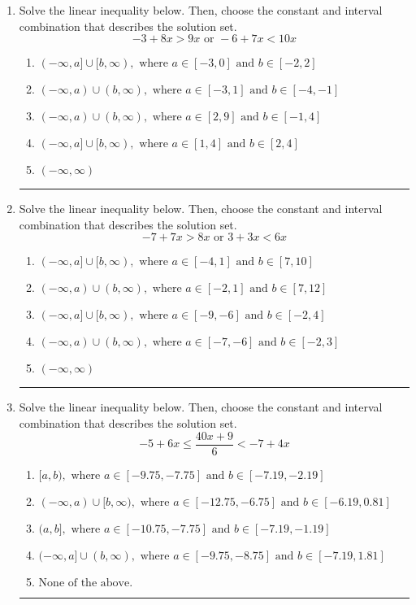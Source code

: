 \documentclass[14pt]{extbook}
\newcommand{\litem}[1]{\item#1\hspace*{-1cm}\rule{\textwidth}{0.4pt}}
\begin{document}
\begin{enumerate}
{\begin{enumerate}[label=\Alph*.]
\end{enumerate} }
\litem{
Solve the linear inequality below. Then, choose the constant and interval combination that describes the solution set.\[ -3 + 8 x > 9 x \text{ or } -6 + 7 x < 10 x \]\begin{enumerate}[label=\Alph*.]
\item \( (-\infty, a] \cup [b, \infty), \text{ where } a \in [-3, 0] \text{ and } b \in [-2, 2] \)
\item \( (-\infty, a) \cup (b, \infty), \text{ where } a \in [-3, 1] \text{ and } b \in [-4, -1] \)
\item \( (-\infty, a) \cup (b, \infty), \text{ where } a \in [2, 9] \text{ and } b \in [-1, 4] \)
\item \( (-\infty, a] \cup [b, \infty), \text{ where } a \in [1, 4] \text{ and } b \in [2, 4] \)
\item \( (-\infty, \infty) \)

\end{enumerate} }
\litem{
Solve the linear inequality below. Then, choose the constant and interval combination that describes the solution set.\[ -7 + 7 x > 8 x \text{ or } 3 + 3 x < 6 x \]\begin{enumerate}[label=\Alph*.]
\item \( (-\infty, a] \cup [b, \infty), \text{ where } a \in [-4, 1] \text{ and } b \in [7, 10] \)
\item \( (-\infty, a) \cup (b, \infty), \text{ where } a \in [-2, 1] \text{ and } b \in [7, 12] \)
\item \( (-\infty, a] \cup [b, \infty), \text{ where } a \in [-9, -6] \text{ and } b \in [-2, 4] \)
\item \( (-\infty, a) \cup (b, \infty), \text{ where } a \in [-7, -6] \text{ and } b \in [-2, 3] \)
\item \( (-\infty, \infty) \)

\end{enumerate} }
\litem{
Solve the linear inequality below. Then, choose the constant and interval combination that describes the solution set.\[ -5 + 6 x \leq \frac{40 x + 9}{6} < -7 + 4 x \]\begin{enumerate}[label=\Alph*.]
\item \( [a, b), \text{ where } a \in [-9.75, -7.75] \text{ and } b \in [-7.19, -2.19] \)
\item \( (-\infty, a) \cup [b, \infty), \text{ where } a \in [-12.75, -6.75] \text{ and } b \in [-6.19, 0.81] \)
\item \( (a, b], \text{ where } a \in [-10.75, -7.75] \text{ and } b \in [-7.19, -1.19] \)
\item \( (-\infty, a] \cup (b, \infty), \text{ where } a \in [-9.75, -8.75] \text{ and } b \in [-7.19, 1.81] \)
\item \( \text{None of the above.} \)


\end{enumerate}}
\end{enumerate}
\end{document}
